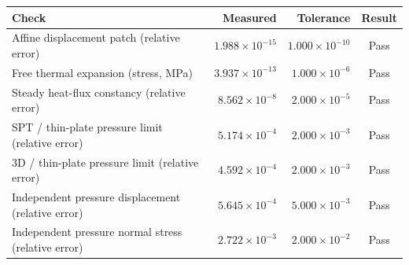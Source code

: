 \begin{tabularx}{\linewidth}{Xrrc}
\toprule
Check & Measured & Tolerance & Result \\
\midrule
Affine displacement patch (relative error) & $1.988\times10^{-15}$ & $1.000\times10^{-10}$ & Pass \\
Free thermal expansion (stress, MPa) & $3.937\times10^{-13}$ & $1.000\times10^{-6}$ & Pass \\
Steady heat-flux constancy (relative error) & $8.562\times10^{-8}$ & $2.000\times10^{-5}$ & Pass \\
SPT / thin-plate pressure limit (relative error) & $5.174\times10^{-4}$ & $2.000\times10^{-3}$ & Pass \\
3D / thin-plate pressure limit (relative error) & $4.592\times10^{-4}$ & $2.000\times10^{-3}$ & Pass \\
Independent pressure displacement (relative error) & $5.645\times10^{-4}$ & $5.000\times10^{-3}$ & Pass \\
Independent pressure normal stress (relative error) & $2.722\times10^{-3}$ & $2.000\times10^{-2}$ & Pass \\
\bottomrule
\end{tabularx}
